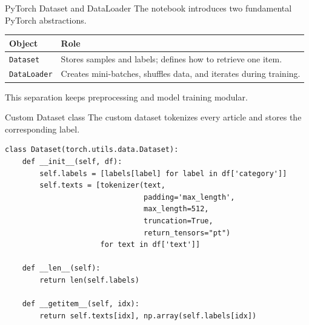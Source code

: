 \documentclass[aspectratio=169]{beamer}
\begin{document}
\begin{frame}{PyTorch Dataset and DataLoader}
The notebook introduces two fundamental PyTorch abstractions.

\vspace{0.2cm}

\begin{center}
\begin{tabular}{ll}
\toprule
\textbf{Object} & \textbf{Role} \\
\midrule
\texttt{Dataset} & Stores samples and labels; defines how to retrieve one item. \\
\texttt{DataLoader} & Creates mini-batches, shuffles data, and iterates during training. \\
\bottomrule
\end{tabular}
\end{center}

\vspace{0.3cm}

This separation keeps preprocessing and model training modular.
\end{frame}

\begin{frame}[fragile]{Custom Dataset class}
The custom dataset tokenizes every article and stores the corresponding label.

\begin{lstlisting}[style=pythonstyle]
class Dataset(torch.utils.data.Dataset):
    def __init__(self, df):
        self.labels = [labels[label] for label in df['category']]
        self.texts = [tokenizer(text,
                                padding='max_length',
                                max_length=512,
                                truncation=True,
                                return_tensors="pt")
                      for text in df['text']]

    def __len__(self):
        return len(self.labels)

    def __getitem__(self, idx):
        return self.texts[idx], np.array(self.labels[idx])
\end{lstlisting}
\end{frame}
\end{document}
